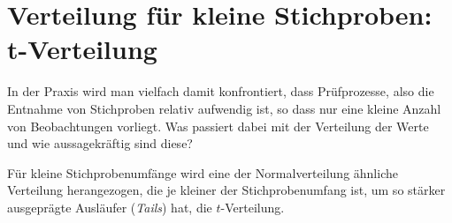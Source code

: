 



\section{Verteilung für kleine Stichproben: t-Verteilung}

In der Praxis wird man vielfach damit konfrontiert, dass Prüfprozesse, also die Entnahme von
Stichproben relativ aufwendig ist, so dass nur eine kleine Anzahl von Beobachtungen vorliegt.
Was passiert dabei mit der Verteilung der Werte und wie aussagekräftig sind diese?

Für kleine Stichprobenumfänge wird eine der Normalverteilung ähnliche Verteilung
herangezogen, die je kleiner der Stichprobenumfang ist, um so stärker ausgeprägte
Ausläufer (\textsl{Tails}) hat, die $t$-Verteilung.

